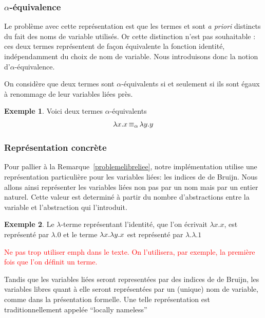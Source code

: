 \documentclass {article}
\theoremstyle{definition}
\newtheorem{example}{Exemple}
\theoremstyle{remark}
\newcommand{\todo}[1]{\textcolor{red}{#1}}
\begin{document}
\subsubsection{$\alpha$-équivalence}
\label{alpha_equiv}
\label{problemelibreliee}

\newcommand{\equivAlpha}{\mathop{\equiv_\alpha}}

Le problème avec cette représentation est que les termes
 et  sont \textit{a
  priori} distincts du fait des noms de variable utilisés. Or cette
distinction n'est pas souhaitable : ces deux termes représentent de
façon équivalente la fonction identité, indépendamment du choix de nom
de variable. Nous introduisons donc la notion d'$\alpha$-équivalence.

On considère que deux termes sont \(\alpha\)-équivalents si et seulement si ils sont 
égaux à renommage de leur variables liées près. 
\begin{example}
  Voici deux termes \(\alpha\)-équivalents 
  \begin{align*}
    & \Lam{x}{\Var{x}} \equivAlpha \Lam{y}{\Var{y}} \\
  \end{align*}
\end{example}

\subsubsection{Représentation concrète}
 
Pour pallier à la Remarque~\ref{problemelibreliee}, notre implémentation utilise une représentation
particulière pour les variables liées: les indices de de Bruijn.  Nous
allons ainsi représenter les variables liées non pas par un nom mais
par un entier naturel. Cette valeur est determiné à partir du nombre
d'abstractions entre la variable et l'abstraction qui l'introduit.

\begin{example}
  Le $\lambda$-terme représentant l'identité, que l'on écrivait \(\lambda x.x\), est représenté par \(\lambda.0\)
  et le terme $\lambda x. \lambda y. x$ est représenté par $\lambda.\lambda.1$ 
\end{example}

\todo{Ne pas trop utiliser emph dans le texte. On l'utilisera, par
  exemple, la première fois que l'on définit un terme.}

Tandis que les variables liées seront representées par des
indices de de Bruijn, les variables libres quant à elle seront
représentées par un (unique) nom de variable, comme dans la
présentation formelle. Une telle représentation est traditionnellement
appelée ``locally nameless''~\citep{chargueraud:locally-nameless}
\end{document}

